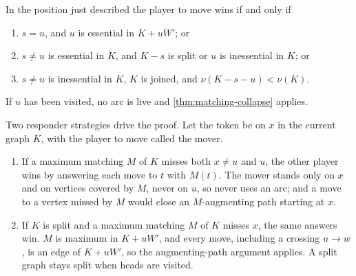 \documentclass[final]{siamart0516}
\numberwithin{theorem}{section}
\numberwithin{equation}{section}
\theoremstyle{siamnonum}
\theoremstyle{plain}
\begin{document}
\begin{theorem}\label{thm:common-tail}
In the position just described the player to move wins if and only if
\begin{enumerate}[label=\textup{(\arabic*)}]
\item $s=u$, and $u$ is essential in $K+uW'$; or
\item $s\neq u$ is essential in $K$, and $K-s$ is split or $u$ is inessential in $K$; or
\item $s\neq u$ is inessential in $K$, $K$ is joined, and $\nu(K-s-u)<\nu(K)$.
\end{enumerate}
If $u$ has been visited, no arc is live and \cref{thm:matching-collapse} applies.
\end{theorem}

Two responder strategies drive the proof. Let the token be on $x$ in the current graph $K$, with the player to move called the mover.

\begin{enumerate}[label=(T\arabic*$'$),start=2]
\item If a maximum matching $M$ of $K$ misses both $x\neq u$ and $u$, the other player wins by answering each move to $t$ with $M(t)$. The mover stands only on $x$ and on vertices covered by $M$, never on $u$, so never uses an arc; and a move to a vertex missed by $M$ would close an $M$-augmenting path starting at $x$.
\item If $K$ is split and a maximum matching $M$ of $K$ misses $x$, the same answers win. $M$ is maximum in $K+uW'$, and every move, including a crossing $u\to w$, is an edge of $K+uW'$, so the augmenting-path argument applies. A split graph stays split when heads are visited.
\end{enumerate}
\end{document}
